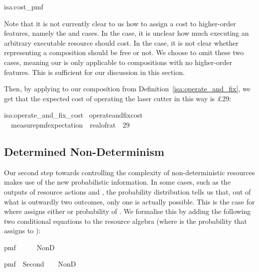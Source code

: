 \documentclass[class=smolathesis,crop=false]{standalone}
\begin{document}
\begin{isadef}{isa:cost_pmf}
  
\end{isadef}

Note that it is not currently clear to us how to assign a cost to higher-order features, namely the  and  cases.
In the  case, it is unclear how much executing an arbitrary executable resource should cost.
In the  case, it is not clear whether representing a composition should be free or not.
We choose to omit these two cases, meaning our  is only applicable to compositions with no higher-order features.
This is sufficient for our discussion in this section.

Then, by applying  to our composition from Definition~\ref{isa:operate_and_fix}, we get that the expected cost of operating the laser cutter in this way is \pounds29:
\begin{isalemma}{isa:operate_and_fix_cost}
  \ operate{\isacharunderscore}and{\isacharunderscore}fix{\isacharunderscore}cost{\isacharcolon}\isanewline
  \ \ measure{\isacharunderscore}pmf{\isachardot}expectation\ \ real{\isacharunderscore}of{\isacharunderscore}rat\ \isacharequal\ 29
\end{isalemma}

\subsection{Determined Non-Determinism}
\label{sec:prob/simple-opt/inject-eqs}

Our second step towards controlling the complexity of non-deterministic resources makes use of the new probabilistic information.
In some cases, such as the outputs of resource actions  and , the probability distribution tells us that, out of what is outwardly two outcomes, only one is actually possible.
This is the case for  where  assigns either  or  probability of .
We formalise this by adding the following two conditional equations to the resource algebra (where  is the probability that  assigns to ):
\begin{isabelle}
\centering
  pmf\ \ \ \isacharequal\ \ \isasymLongrightarrow\ NonD\ \ \ \isacharequal\ 
\item
  pmf\ \ Second\ \isacharequal\ \ \isasymLongrightarrow\ NonD\ \ \ \isacharequal\ 
\end{isabelle}
\end{document}
